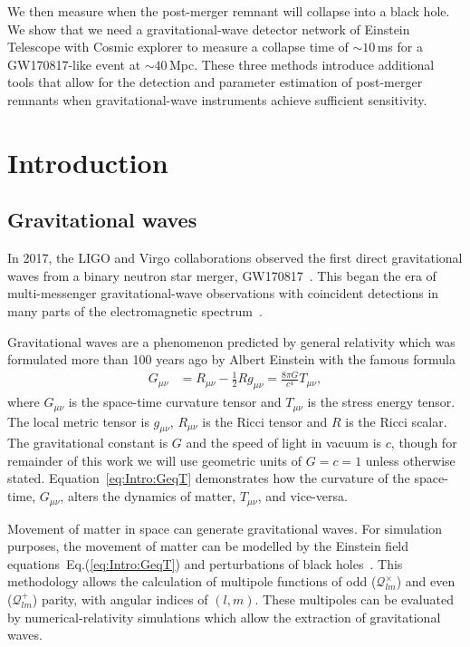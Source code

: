 \documentclass[../Thesis.tex]{subfiles}
\begin{document}
    We  then measure when the post-merger remnant will collapse into a black hole.
    We show that we need a gravitational-wave detector network of Einstein Telescope with Cosmic explorer to measure a collapse time of $\sim\!10$\,ms for a GW170817-like event at $\sim\!40$\,Mpc.
    These three methods introduce additional tools that allow for the detection and parameter estimation of post-merger remnants when gravitational-wave instruments achieve sufficient sensitivity.
    
    
\begingroup
\clearpage%
\let\clearpage\relax%
\vspace*{-2cm}%



\chapter{Introduction} \label{chapter:Introduction}
\endgroup 


    \section{Gravitational waves} 
    In 2017, the LIGO and Virgo collaborations observed the first direct gravitational waves from a binary neutron star merger, GW170817~\cite{GW170817Detection}.
    This began the era of multi-messenger gravitational-wave observations with coincident detections in many parts of the electromagnetic spectrum~\cite{Goldstein2017,Coulter2017,Troja2017,Nicholl2017,Chornock2017,Margutti2017,Alexander2017,GW170817multi}. \par
    
    Gravitational waves are a phenomenon predicted by general relativity which was formulated more than 100 years ago by Albert Einstein with the famous formula
    \begin{align}
        G_{\mu\nu} & = R_{\mu\nu} - \frac{1}{2}R  g_{\mu\nu}  =  \frac{8\pi G}{c^4} T_{\mu\nu}, \label{eq:Intro:GeqT}
    \end{align}
    where $G_{\mu\nu}$ is the space-time curvature tensor and $T_{\mu\nu}$ is the stress energy tensor. The local metric tensor is $g_{\mu\nu}$, $R_{\mu\nu}$ is the Ricci tensor and $R$ is the Ricci scalar. 
    The gravitational constant is $G$ and the speed of light in vacuum is $c$, though for remainder of this work we will use geometric units of $G=c=1$ unless otherwise stated. 
    Equation~\ref{eq:Intro:GeqT} demonstrates how the curvature of the space-time, $G_{\mu\nu}$, alters the dynamics of matter, $T_{\mu\nu}$, and vice-versa. \par
    Movement of matter in space can generate gravitational waves.
    For simulation purposes, the movement of matter can be modelled by the Einstein field equations~Eq.(\ref{eq:Intro:GeqT}) and perturbations of black holes~\cite[e.g.,][]{Moncrief1974,Abrahams1996,Andrade1999,Nagar2005}.
    This methodology allows the calculation of multipole functions of odd ($\mathcal{Q}^\times_{lm}$) and even ($\mathcal{Q}^+_{lm}$) parity, with angular indices of $(l,m)$.
    These multipoles can be evaluated by numerical-relativity simulations which allow the extraction of gravitational waves.
\end{document}
